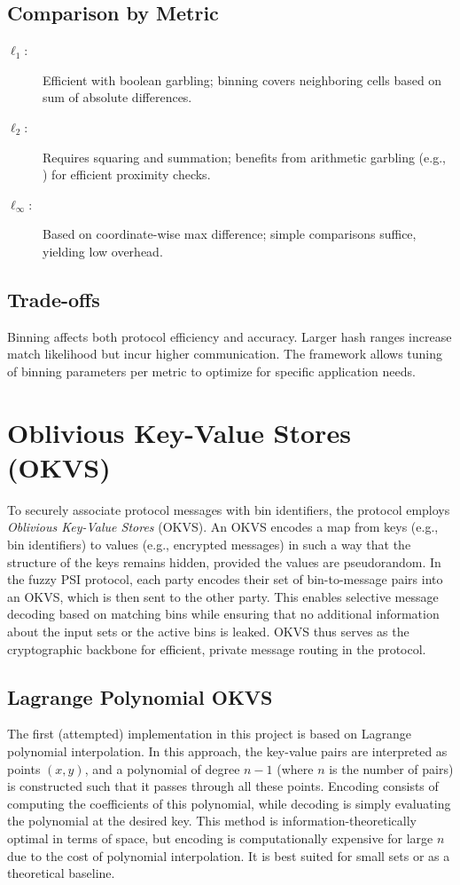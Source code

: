 \subsection{Comparison by Metric}

\begin{description}
	\item[$\ell_1$:] Efficient with boolean garbling; binning covers neighboring cells based on sum of absolute differences.
	\item[$\ell_2$:] Requires squaring and summation; benefits from arithmetic garbling (e.g., \cite{ballGarblingGadgetsBoolean2016}) for efficient proximity checks.
	\item[$\ell_\infty$:] Based on coordinate-wise max difference; simple comparisons suffice, yielding low overhead.
\end{description}

\subsection{Trade-offs}

Binning affects both protocol efficiency and accuracy. Larger hash ranges increase match likelihood but incur higher communication. The framework allows tuning of binning parameters per metric to optimize for specific application needs.

\section{Oblivious Key-Value Stores (OKVS)}

To securely associate protocol messages with bin identifiers, the protocol employs \emph{Oblivious Key-Value Stores} (OKVS). An OKVS encodes a map from keys (e.g., bin identifiers) to values (e.g., encrypted messages) in such a way that the structure of the keys remains hidden, provided the values are pseudorandom. In the fuzzy PSI protocol, each party encodes their set of bin-to-message pairs into an OKVS, which is then sent to the other party. This enables selective message decoding based on matching bins while ensuring that no additional information about the input sets or the active bins is leaked. OKVS thus serves as the cryptographic backbone for efficient, private message routing in the protocol.

\subsection{Lagrange Polynomial OKVS}
The first (attempted) implementation in this project is based on Lagrange polynomial interpolation. In this approach, the key-value pairs are interpreted as points $(x, y)$, and a polynomial of degree $n-1$ (where $n$ is the number of pairs) is constructed such that it passes through all these points. Encoding consists of computing the coefficients of this polynomial, while decoding is simply evaluating the polynomial at the desired key. This method is information-theoretically optimal in terms of space, but encoding is computationally expensive for large $n$ due to the cost of polynomial interpolation. It is best suited for small sets or as a theoretical baseline.

